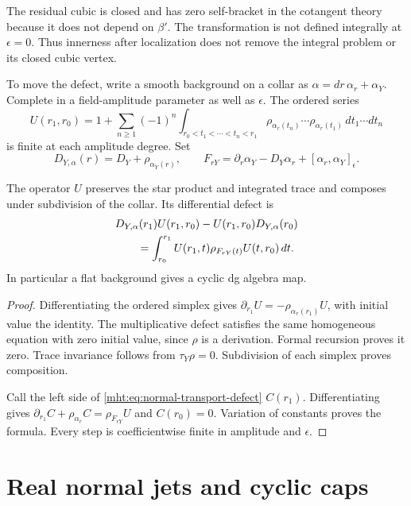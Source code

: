 The residual cubic is closed and has zero self-bracket in
the cotangent theory because it does not depend on $\beta'$.
The transformation is not defined integrally at $\epsilon=0$.
Thus innerness after localization does not remove the
integral problem or its closed cubic vertex.

To move the defect, write a smooth background on a collar as
$\alpha=dr\,\alpha_r+\alpha_Y$. Complete in a field-amplitude
parameter as well as $\epsilon$. The ordered series
\begin{equation}\label{mht:eq:normal-hamiltonian-transport}
 U(r_1,r_0)=1+\sum_{n\geq1}(-1)^n
 \int_{r_0<t_1<\cdots<t_n<r_1}
 \rho_{\alpha_r(t_n)}\cdots\rho_{\alpha_r(t_1)}
                                      \,dt_1\cdots dt_n
\end{equation}
is finite at each amplitude degree. Set
\[
 D_{Y,\alpha}(r)=D_Y+\rho_{\alpha_Y(r)},\qquad
 F_{rY}=\partial_r\alpha_Y-D_Y\alpha_r
                         +[\alpha_r,\alpha_Y]_\epsilon.
\]

\begin{proposition}\label{mht:prop:normal-transport-curvature}
The operator $U$ preserves the star product and integrated
trace and composes under subdivision of the collar.
Its differential defect is
\begin{align}
 &D_{Y,\alpha}(r_1)U(r_1,r_0)-U(r_1,r_0)D_{Y,\alpha}(r_0)
       \notag\\
 &\qquad=\int_{r_0}^{r_1}
       U(r_1,t)\rho_{F_{rY}(t)}U(t,r_0)\,dt.
       \label{mht:eq:normal-transport-defect}
\end{align}
In particular a flat background gives a cyclic dg algebra map.
\end{proposition}
\begin{proof}
Differentiating the ordered simplex gives
$\partial_{r_1}U=-\rho_{\alpha_r(r_1)}U$, with initial value
the identity. The multiplicative defect satisfies the same
homogeneous equation with zero initial value, since $\rho$
is a derivation. Formal recursion proves it zero.
Trace invariance follows from $\tau_Y\rho=0$.
Subdivision of each simplex proves composition.

Call the left side of \eqref{mht:eq:normal-transport-defect}
$C(r_1)$. Differentiating gives
$\partial_{r_1}C+\rho_{\alpha_r}C=\rho_{F_{rY}}U$ and
$C(r_0)=0$. Variation of constants proves the formula.
Every step is coefficientwise finite in amplitude and
$\epsilon$.
\end{proof}

\section{Real normal jets and cyclic caps}

